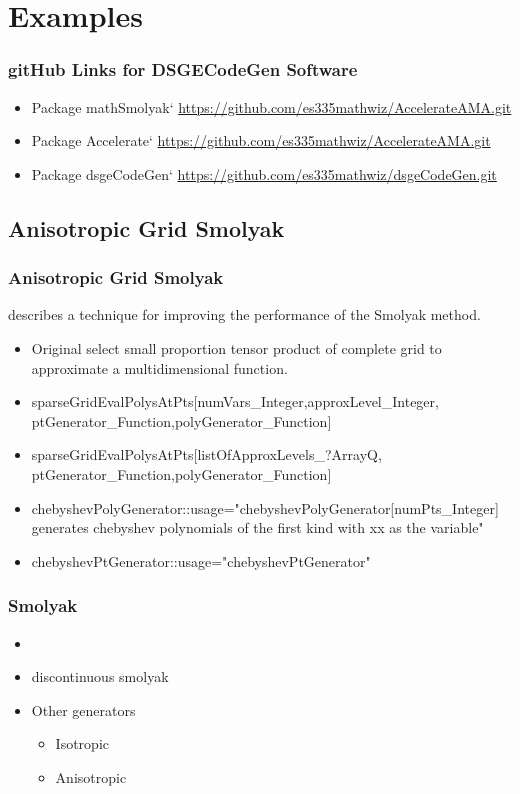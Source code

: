\documentclass{beamer}
\begin{document}
\section{Examples}


\begin{frame}
  \frametitle{gitHub Links for DSGECodeGen Software}
  

  \begin{itemize}
  \item Package mathSmolyak` \href{https://github.com/es335mathwiz/AccelerateAMA.git}{https://github.com/es335mathwiz/AccelerateAMA.git}
  \item Package Accelerate` \href{https://github.com/es335mathwiz/AccelerateAMA.git}{https://github.com/es335mathwiz/AccelerateAMA.git}
  \item Package dsgeCodeGen` \href{https://github.com/es335mathwiz/dsgeCodeGen.git}{https://github.com/es335mathwiz/dsgeCodeGen.git}
\end{itemize}

\end{frame}



\subsection{Anisotropic Grid Smolyak}


\begin{frame}
  \frametitle{Anisotropic Grid Smolyak}
{\small
\cite{Judd2013} describes a technique for improving the performance of
the Smolyak method.
\begin{itemize}
\item Original select small proportion tensor product of complete grid to 
approximate a multidimensional function.
\item sparseGridEvalPolysAtPts[numVars\_Integer,approxLevel\_Integer,
ptGenerator\_Function,polyGenerator\_Function] 
\item sparseGridEvalPolysAtPts[listOfApproxLevels\_?ArrayQ,
ptGenerator\_Function,polyGenerator\_Function] 
\item chebyshevPolyGenerator::usage="chebyshevPolyGenerator[numPts\_Integer] generates chebyshev polynomials of the first kind with xx as the variable"
\item chebyshevPtGenerator::usage="chebyshevPtGenerator"
\end{itemize}
}
\end{frame}

\begin{frame}
  \frametitle{Smolyak }
  \begin{itemize}
  \item \item discontinuous smolyak
\item Other generators
  \begin{itemize}
  \item Isotropic 
  \item Anisotropic
  \end{itemize}
  \end{itemize}
\end{frame}
\end{document}
